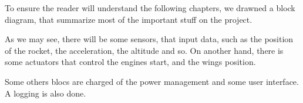 To ensure the reader will understand the following chapters, we drawned a 
block diagram, that summarize most of the important stuff on the project.



As we may see, there will be some sensors, that input data, such as the
position of the rocket, the acceleration, the altitude and so.
On another hand, there is some actuators that control the engines start, 
and the wings position.

Some others blocs are charged of the power management and some user interface.
A logging is also done.